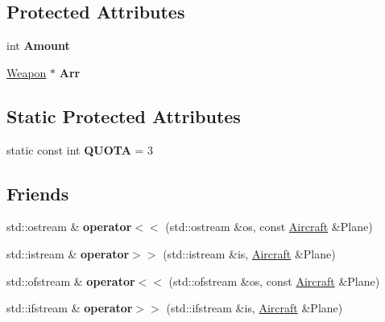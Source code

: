 \subsection*{Protected Attributes}
\begin{DoxyCompactItemize}
\item 
\mbox{\label{class_aircraft_carrier_group_1_1_aircraft_af53d6b1776b3ebd20b64843b5b6d7785}} 
int {\bfseries Amount}
\item 
\mbox{\label{class_aircraft_carrier_group_1_1_aircraft_a4edf7fbcaf2fb3621a80ae2e92fb249e}} 
\mbox{\hyperlink{class_aircraft_carrier_group_1_1_weapon}{Weapon}} $\ast$ {\bfseries Arr}
\end{DoxyCompactItemize}
\subsection*{Static Protected Attributes}
\begin{DoxyCompactItemize}
\item 
\mbox{\label{class_aircraft_carrier_group_1_1_aircraft_a00a4f361c3a1df31dff26d83a42c4e39}} 
static const int {\bfseries Q\+U\+O\+TA} = 3
\end{DoxyCompactItemize}
\subsection*{Friends}
\begin{DoxyCompactItemize}
\item 
\mbox{\label{class_aircraft_carrier_group_1_1_aircraft_a50cdd2c0cbf245722f2a454b9275bdb8}} 
std\+::ostream \& {\bfseries operator$<$$<$} (std\+::ostream \&os, const \mbox{\hyperlink{class_aircraft_carrier_group_1_1_aircraft}{Aircraft}} \&Plane)
\item 
\mbox{\label{class_aircraft_carrier_group_1_1_aircraft_a8d14cc002b185ef2a06da4e01d2d9e2a}} 
std\+::istream \& {\bfseries operator$>$$>$} (std\+::istream \&is, \mbox{\hyperlink{class_aircraft_carrier_group_1_1_aircraft}{Aircraft}} \&Plane)
\item 
\mbox{\label{class_aircraft_carrier_group_1_1_aircraft_a4aca1bee1af26a984a0694c588a79d43}} 
std\+::ofstream \& {\bfseries operator$<$$<$} (std\+::ofstream \&os, const \mbox{\hyperlink{class_aircraft_carrier_group_1_1_aircraft}{Aircraft}} \&Plane)
\item 
\mbox{\label{class_aircraft_carrier_group_1_1_aircraft_a8cd1afd508ef28d2325d4dbb12eb2eff}} 
std\+::ifstream \& {\bfseries operator$>$$>$} (std\+::ifstream \&is, \mbox{\hyperlink{class_aircraft_carrier_group_1_1_aircraft}{Aircraft}} \&Plane)
\end{DoxyCompactItemize}


